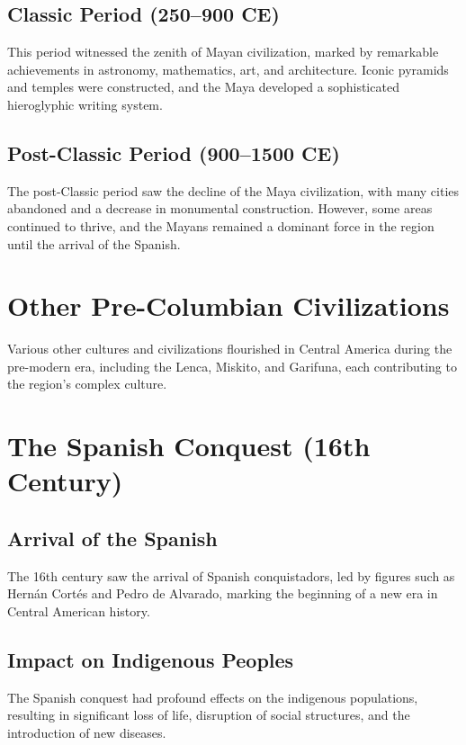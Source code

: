 \documentclass[a4paper,12pt]{book}
\begin{document}
\subsection{Classic Period (250–900 CE)}
\label{subsec:classic-maya}
This period witnessed the zenith of Mayan civilization, marked by remarkable achievements in astronomy, mathematics, art, and architecture. Iconic pyramids and temples were constructed, and the Maya developed a sophisticated hieroglyphic writing system.

\subsection{Post-Classic Period (900–1500 CE)}
\label{subsec:post-classic-maya}
The post-Classic period saw the decline of the Maya civilization, with many cities abandoned and a decrease in monumental construction. However, some areas continued to thrive, and the Mayans remained a dominant force in the region until the arrival of the Spanish.

\section{Other Pre-Columbian Civilizations}
\label{sec:other-pre-columbian-civilizations}
Various other cultures and civilizations flourished in Central America during the pre-modern era, including the Lenca, Miskito, and Garifuna, each contributing to the region's complex culture.

\section{The Spanish Conquest (16th Century)}
\label{sec:spanish-conquest}
\subsection{Arrival of the Spanish}
\label{subsec:arrival-spanish}
The 16th century saw the arrival of Spanish conquistadors, led by figures such as Hernán Cortés and Pedro de Alvarado, marking the beginning of a new era in Central American history.

\subsection{Impact on Indigenous Peoples}
\label{subsec:impact-indigenous-peoples}
The Spanish conquest had profound effects on the indigenous populations, resulting in significant loss of life, disruption of social structures, and the introduction of new diseases.
\end{document}

